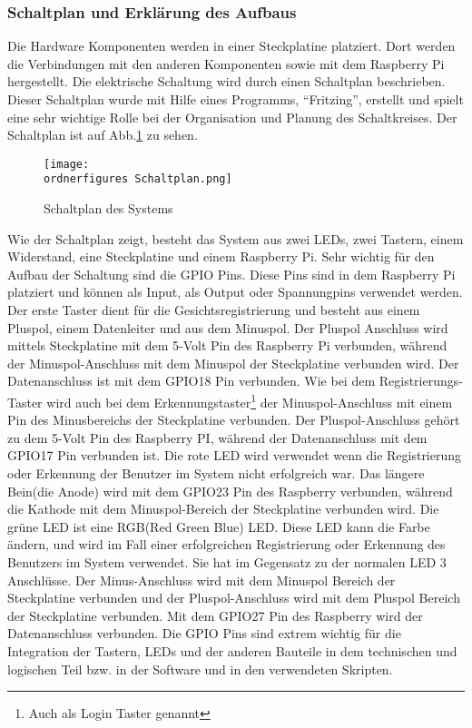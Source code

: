 \subsubsection{Schaltplan und Erklärung des Aufbaus}
Die Hardware Komponenten werden in einer Steckplatine platziert. Dort werden die Verbindungen mit den anderen Komponenten sowie mit dem Raspberry Pi hergestellt. Die elektrische Schaltung wird durch einen Schaltplan beschrieben. Dieser Schaltplan wurde mit Hilfe eines Programms, ``Fritzing'', erstellt und spielt eine sehr wichtige Rolle bei der Organisation und Planung des Schaltkreises. Der Schaltplan ist auf Abb.\ref{fig:Schaltplan} zu sehen.
\begin{figure}[H]
	\texttt{[image: \\ordnerfigures Schaltplan.png]}
	\caption{Schaltplan des Systems}
	\label{fig:Schaltplan}
\end{figure}
Wie der Schaltplan zeigt, besteht das System aus zwei LEDs, zwei Tastern, einem Widerstand, eine Steckplatine und einem Raspberry Pi. Sehr wichtig für den Aufbau der Schaltung sind die GPIO Pins. Diese Pins sind in dem Raspberry Pi platziert und können als Input, als Output oder Spannungpins verwendet werden. 
Der erste Taster dient für die Gesichtsregistrierung und besteht aus einem Pluspol, einem Datenleiter und aus dem Minuspol. Der Pluspol Anschluss wird mittels Steckplatine mit dem 5-Volt Pin des Raspberry Pi verbunden, während der Minuspol-Anschluss mit dem Minuspol der Steckplatine verbunden wird. Der Datenanschluss ist mit dem GPIO18 Pin verbunden. Wie bei dem Registrierungs-Taster wird auch bei dem Erkennungstaster\footnote{Auch als Login Taster genannt} der Minuspol-Anschluss mit einem Pin des Minusbereichs der Steckplatine verbunden. Der Pluspol-Anschluss gehört zu dem 5-Volt Pin des Raspberry PI, während der Datenanschluss mit dem GPIO17 Pin verbunden ist. Die rote LED wird verwendet wenn die Registrierung oder Erkennung der Benutzer im System nicht erfolgreich war. Das längere Bein(die Anode) wird mit dem GPIO23 Pin des Raspberry verbunden, während die Kathode mit dem Minuspol-Bereich der Steckplatine verbunden wird. Die grüne LED ist eine RGB(Red Green Blue) LED. Diese LED kann die Farbe ändern, und wird im Fall einer erfolgreichen Registrierung oder Erkennung des Benutzers im System verwendet. Sie hat im Gegensatz zu der normalen LED 3 Anschlüsse. Der Minus-Anschluss wird mit dem Minuspol Bereich der Steckplatine verbunden und der Pluspol-Anschluss wird mit dem Pluspol Bereich der Steckplatine verbunden. Mit dem GPIO27 Pin des Raspberry wird der Datenanschluss verbunden. Die GPIO Pins sind extrem wichtig für die Integration der Tastern, LEDs und der anderen Bauteile in dem technischen und logischen Teil bzw. in der Software und in den verwendeten Skripten.	
